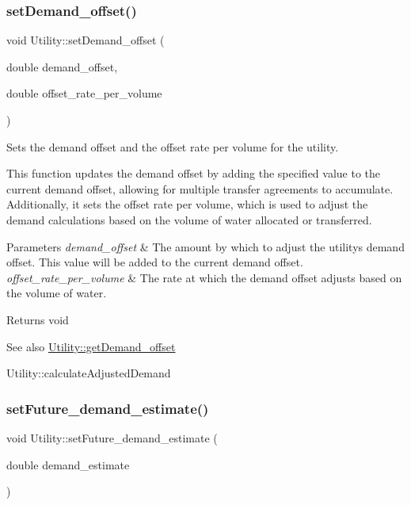 \subsubsection{\texorpdfstring{set\+Demand\+\_\+offset()}{setDemand\_offset()}}
{\footnotesize\ttfamily void Utility\+::set\+Demand\+\_\+offset (\begin{DoxyParamCaption}\item[{double}]{demand\+\_\+offset,  }\item[{double}]{offset\+\_\+rate\+\_\+per\+\_\+volume }\end{DoxyParamCaption})}



Sets the demand offset and the offset rate per volume for the utility. 

This function updates the demand offset by adding the specified value to the current demand offset, allowing for multiple transfer agreements to accumulate. Additionally, it sets the offset rate per volume, which is used to adjust the demand calculations based on the volume of water allocated or transferred.


\begin{DoxyParams}{Parameters}
{\em demand\+\_\+offset} & The amount by which to adjust the utility\textquotesingle{}s demand offset. This value will be added to the current demand offset. \\
\hline
{\em offset\+\_\+rate\+\_\+per\+\_\+volume} & The rate at which the demand offset adjusts based on the volume of water.\\
\hline
\end{DoxyParams}
\begin{DoxyReturn}{Returns}
void
\end{DoxyReturn}
\begin{DoxySeeAlso}{See also}
\mbox{\hyperlink{classUtility_acdd0e90d638d4a127a06787fe427ab59}{Utility\+::get\+Demand\+\_\+offset}} 

Utility\+::calculate\+Adjusted\+Demand 
\end{DoxySeeAlso}
\mbox{\label{classUtility_aa465673857827435f256bde97d36b77d}} 
\subsubsection{\texorpdfstring{set\+Future\+\_\+demand\+\_\+estimate()}{setFuture\_demand\_estimate()}}
{\footnotesize\ttfamily void Utility\+::set\+Future\+\_\+demand\+\_\+estimate (\begin{DoxyParamCaption}\item[{double}]{demand\+\_\+estimate }\end{DoxyParamCaption})}



